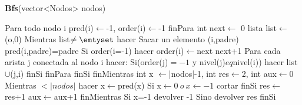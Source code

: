 \documentclass[spanish,12pt]{article}
\begin{document}
\begin{algorithm}[H]{\textbf{Bfs}(vector<Nodos> nodos)}
	\begin{algorithmic}[1]
		\State \quad Para todo nodo i
			\State \quad \quad  pred(i)$\gets$-1, order(i)$\gets$-1
		\State \quad finPara
		\State \quad int next$\gets$ 0
		\State \quad lista list$\gets${(o,0)}
		\State \quad Mientras list$\neq \emtyset$ hacer
			\State \quad \quad Sacar un elemento (i,padre)
			\State \quad \quad pred(i,padre)=padre
			\State \quad \quad Si order(i=-1) hacer
				\State \quad \quad \quad order(i)$\gets$next
				\State \quad \quad \quad next+1
				\State \quad \quad \quad Para cada arista j conectada al nodo i hacer:
					\State \quad \quad \quad \quad Si(order(j)$=-1$ y nivel(j)$eq$nivel(i)) hacer %
						 \State \quad \quad \quad \quad \quad list$\cup${(j,i)}
					\State \quad \quad \quad \quad finSi
				\State \quad \quad \quad   finPara
			\State \quad \quad  finSi
		\State \quad finMientras
		\State \quad int x $\gets$|nodos|-1, int res$\gets$2, int aux$\gets$0
		\State \quad Mientras $< |nodos|$ hacer
			\State \quad \quad  x$\gets$pred(x)
			\State \quad \quad Si x$\gets0 \ o \ x\gets-1$ cortar finSi
			\State \quad \quad res$\gets$res+1
			\State \quad \quad aux$\gets$aux+1
		\State \quad finMientras
		\State \quad Si x=-1
			\State \quad \quad devolver -1
		\State \quad Sino
			\State \quad \quad  devolver res
		\State \quad finSi




	\end{algorithmic}
\end{algorithm}
\end{document}
